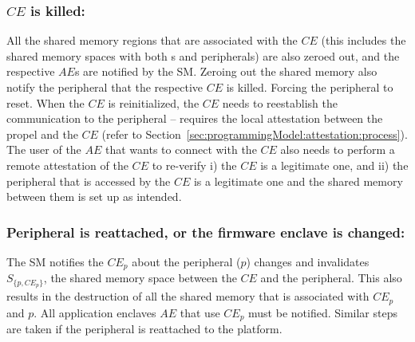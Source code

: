 \subsubsection{$CE$ is killed:} All the shared memory regions that are associated with the $CE$ (this includes the shared memory spaces with both \app{}s and peripherals) are also zeroed out, and the respective $AE$s are notified by the SM. Zeroing out the shared memory also notify the peripheral that the respective $CE$ is killed. Forcing the peripheral to reset. When the $CE$ is reinitialized, the $CE$ needs to reestablish the communication to the peripheral -- requires the local attestation between the propel and the $CE$ (refer to Section~\ref{sec:programmingModel:attestation:process}). The user of the $AE$ that wants to connect with the $CE$ also needs to perform a remote attestation of the $CE$ to re-verify i) the $CE$ is a legitimate one, and ii) the peripheral that is accessed by the $CE$ is a legitimate one and the shared memory between them is set up as intended.
    
\subsubsection{Peripheral is reattached, or the firmware enclave is changed:} The SM notifies the $CE_p$ about the peripheral ($p$) changes and invalidates $S_{\{p, CE_p\}}$, the shared memory space between the $CE$ and the peripheral. This also results in the destruction of all the shared memory that is associated with $CE_p$ and $p$. All application enclaves $AE$ that use $CE_p$ must be notified. Similar steps are taken if the peripheral is reattached to the platform.

